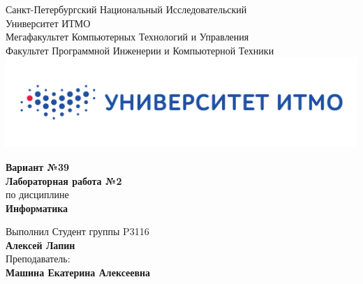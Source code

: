 \documentclass[12pt,onecolumn]{article}
\begin{document}
\setcounter{tocdepth}{4}
\begin{center}
    Санкт-Петербургский Национальный Исследовательский\\ 
    Университет ИТМО\\
    Мегафакультет Компьютерных Технологий и Управления\\
    Факультет Программной Инженерии и Компьютерной Техники \\
    \includegraphics[scale=0.3]{itm.jpg} %
\end{center}
\vspace{1cm}


\begin{center}
    \large \textbf{Вариант №39}\\
    \textbf{Лабораторная работа №2}\\
    по дисциплине\\
    \textbf{Информатика}
\end{center}

\vspace{2cm}

\begin{flushright}
  Выполнил Студент  группы P3116\\
  \textbf{Алексей Лапин}\\
  Преподаватель: \\
  \textbf{Машина Екатерина Алексеевна }\\
\end{flushright}
\end{document}
